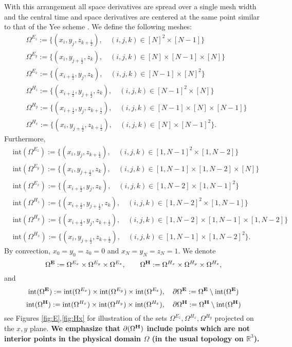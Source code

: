 \documentclass[12pt,reqno]{amsart}
\newcommand{\R}{\mathbb{R}}
\newcommand{\e}{{\bf E}}
\newcommand{\h}{{\bf H}}
\theoremstyle{definition}
\numberwithin{equation}{section}
\def\Gw{\Omega}     \def\Gx{\Xi}         \def\Gy{\Psi}
\begin{document}
	
	With this arrangement all space derivatives are spread over a single mesh width and the central time and space derivatives
	are centered at the same point similar to that of the Yee scheme \cite{yee}. 
	We define the following meshes:
	\begin{align*}
		&\Gw^{E_z}:=\{(x_i,y_j,z_{k+\frac{1}{2}}),\quad (i,j,k)\in [N]^2 \times[N-1]\} \\
		& \Gw^{E_y}:=\{(x_i,y_{j+\frac{1}{2}},z_{k}), \quad (i,j,k)\in [N]\times [N-1] \times[N] \}\\
		& \Gw^{E_x}:=\{ (x_{i+\frac{1}{2}},y_{j},z_{k}),\quad (i,j,k) \in [N-1]\times [N]^2 \} \\
		&\Gw^{H_z}:=\{ (x_{i+\frac{1}{2}},y_{j+\frac{1}{2}},z_{k}),\quad (i,j,k)\in [N-1]^2\times[N] \}\\
		&\Gw^{H_y}:=\{ (x_{i+\frac{1}{2}},y_j,z_{k+\frac{1}{2}}),\quad (i,j,k) \in [N-1]\times [N] \times [N-1] \}\\
		& \Gw^{H_x}:=\{ (x_i,y_{j+\frac{1}{2}},z_{k+\frac{1}{2}}), \quad (i,j,k) \in [N]\times [N-1]^2\}.
	\end{align*}
Furthermore,
	\begin{align*}
	&\mathrm{int}(\Gw^{E_z}):=\{(x_i,y_j,z_{k+\frac{1}{2}}),\quad (i,j,k)\in [1,N-1]^2 \times[1,N-2]\} \\
	&\mathrm{int}( \Gw^{E_y}):=\{(x_i,y_{j+\frac{1}{2}},z_{k}), \quad (i,j,k)\in [1,N-1]\times [1,N-2] \times[N] \}\\
	& \mathrm{int}(\Gw^{E_x}):=\{ (x_{i+\frac{1}{2}},y_{j},z_{k}),\quad (i,j,k) \in [1,N-2]\times [1,N-1]^2 \} \\
	&\mathrm{int}(\Gw^{H_z}):=\{ (x_{i+\frac{1}{2}},y_{j+\frac{1}{2}},z_{k}),\quad (i,j,k)\in [1,N-2]^2\times[1,N-1] \}\\
	&\mathrm{int}(\Gw^{H_y}):=\{ (x_{i+\frac{1}{2}},y_j,z_{k+\frac{1}{2}}),\quad (i,j,k) \in [1,N-2]\times [1,N-1] \times [1,N-2] \}\\
	& \mathrm{int}(\Gw^{H_x}):=\{ (x_i,y_{j+\frac{1}{2}},z_{k+\frac{1}{2}}), \quad (i,j,k) \in [1,N-1]\times [1,N-2]^2\}.
\end{align*}
By convection, $x_0=y_0=z_0=0$ and $x_N=y_N=z_N=1$.
	We denote 
$$
\Gw^{{\bf E}}:=\Gw^{E_x}\times \Gw^{E_y}\times \Gw^{E_z}, \qquad 
\Gw^{\bf H}:=
\Gw^{H_x}\times \Gw^{H_y}\times \Gw^{H_z},
$$
and 
$$
\mathrm{int}(\Gw^{{\e}}):=\mathrm{int}(\Gw^{E_x})\times \mathrm{int}(\Gw^{E_y})\times \mathrm{int}(\Gw^{E_z}),
\quad \partial \Gw^\e:=\Gw^\e\setminus  \mathrm{int}(\Gw^{\e})
$$
$$
\mathrm{int}(\Gw^{\h}):=
\mathrm{int}(\Gw^{H_x})\times \mathrm{int}(\Gw^{H_y})\times \mathrm{int}(\Gw^{H_z}),
\quad \partial \Gw^\h:=\Gw^\h\setminus  \mathrm{int}(\Gw^{\h})
$$
see Figures \ref{fig:E},\ref{fig:Hx} for illustration of the sets 
$\Gw^{E_z}, \Gw^{H_x},\Gw^{H_y}$ projected on the $x,y$ plane.
{\bf We emphasize that $\partial(\Gw^\h)$ include points which are not interior points
	 in the physical domain $\Gw$	 (in the usual topology on $\R^3$). }
\end{document}
